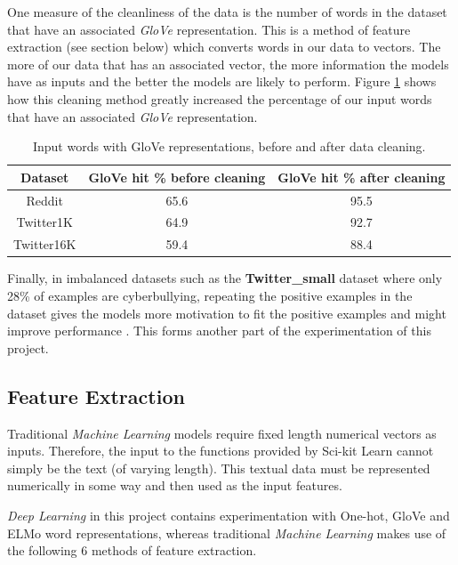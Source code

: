 \documentclass[12pt,a4paper]{article}
\begin{document}
One measure of the cleanliness of the data is the number of words in the dataset that have an associated \textit{GloVe} representation. This is a method of feature extraction (see section below) which converts words in our data to vectors. The more of our data that has an associated vector, the more information the models have as inputs and the better the models are likely to perform. Figure \ref{glove} shows how this cleaning method greatly increased the percentage of our input words that have an associated \textit{GloVe} representation.

\begin{table}[htb]
	\centering
	\caption{Input words with GloVe representations, before and after data cleaning.}
	\vspace*{6pt}
	\label{glove}
	\begin{tabular}{ccc}\hline\hline
		\textbf{Dataset} & \textbf{GloVe hit \% before cleaning} & \textbf{GloVe hit \% after cleaning} \\ \hline
		Reddit & 65.6 & 95.5 \\ 
		Twitter1K & 64.9 & 92.7 \\
		Twitter16K & 59.4 & 88.4 \\
	\end{tabular}
\end{table}

Finally, in imbalanced datasets such as the \textbf{Twitter\_small} dataset where only 28\% of examples are cyberbullying, repeating the positive examples in the dataset gives the models more motivation to fit the positive examples and might improve performance \cite{Reynolds}. This forms another part of the experimentation of this project.


\subsection{Feature Extraction}
Traditional \textit{Machine Learning} models require fixed length numerical vectors as inputs. Therefore, the input to the functions provided by Sci-kit Learn cannot simply be the text (of varying length). This textual data must be represented numerically in some way and then used as the input features.

\textit{Deep Learning} in this project contains experimentation with One-hot, GloVe and ELMo word representations, whereas traditional \textit{Machine Learning} makes use of the following 6 methods of feature extraction.
\end{document}
